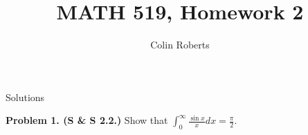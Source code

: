 \documentclass[leqno]{article}
\author{Colin Roberts}
\title{MATH 519, Homework 2}
\theoremstyle{nonumberplain}
\begin{document}
\maketitle
\begin{large}
\begin{center}
Solutions
\end{center}
\end{large}


\noindent\textbf{Problem 1. (S \& S 2.2.)}  Show that $\int_0^\infty \frac{\sin x}{x} dx = \frac{\pi}{2}$.
\end{document}
